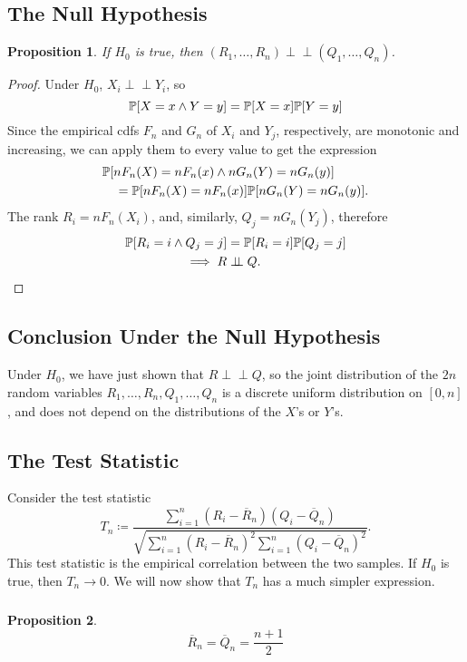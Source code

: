\documentclass[letterpaper, reqno]{amsart}
\newtheorem{prop}{Proposition}[section]
\numberwithin{equation}{section}
\newcommand{\ddfrac}[2]{\frac{\displaystyle #1}{\displaystyle #2}}
\newcommand{\Prob}[1]{\mathbb{P}\mleft[#1\mright]}
\newcommand{\indep}{\perp \!\!\! \perp}  %
\newcommand{\sumi}[2]{\sum_{#1=1}^{#2}}
\newcommand{\Rnbar}{\overline{R}_n}
\newcommand{\Qnbar}{\overline{Q}_n}
\begin{document}
\subsection{The Null Hypothesis} \label{subsec:4}
\begin{prop}
  If $H_0$ is true, then $(R_1, \dots, R_n) \indep (Q_1, \dots, Q_n)$.
\end{prop}

\begin{proof}
  Under $H_0$, $X_i \indep Y_i$, so
  \[ \Prob{X = x \land Y = y} = \Prob{X=x}\Prob{Y=y} \]
  Since the empirical cdfs $F_n$ and $G_n$ of $X_i$ and $Y_j$, respectively, are
  monotonic and increasing, we can apply them to every value to get the expression
  \[ \begin{split}
      &\Prob{nF_n(X) = nF_n(x) \land nG_n(Y) = nG_n(y)} \\
      &\quad = \Prob{nF_n(X)=nF_n(x)}\Prob{nG_n(Y)=nG_n(y)}.
      \end{split}
  \]
  The rank $R_i = n F_n(X_i)$, and, similarly, $Q_j = n G_n(Y_j)$, therefore
  \begin{align*}
    \Prob{R_i = i \land Q_j = j} &= \Prob{R_i = i}\Prob{Q_j = j} \\
    \implies R &\indep Q. \qedhere
  \end{align*}
\end{proof}

\subsection{Conclusion Under the Null Hypothesis} \label{subsec:5}
Under $H_0$, we have just shown that $R \indep Q$, so the joint distribution of
the $2n$ random variables $R_1, \dots, R_n, Q_1, \dots, Q_n$ is a discrete
uniform distribution on $[0, n]$, and does not depend on the distributions of
the $X$'s or $Y$'s.

\subsection{The Test Statistic} \label{subsec:6}
Consider the test statistic
\[ T_n \coloneqq \ddfrac{\sumi{i}{n}(R_i - \Rnbar)(Q_i - \Qnbar)}
                        {\sqrt{\sumi{i}{n} (R_i - \Rnbar)^2 \sumi{i}{n} (Q_i - \Qnbar)^2}}. \]
This test statistic is the empirical correlation between the two samples. If
$H_0$ is true, then $T_n \to 0$. We will now show that $T_n$ has a much simpler
expression.

\subsubsection{}
\begin{prop} \label{prop:rn1}
  \[ \Rnbar = \Qnbar = \frac{n+1}{2} \]
\end{prop}
\end{document}
